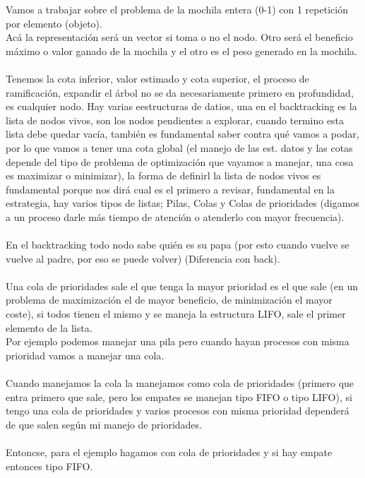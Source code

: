 \begin{example}
	Vamos a trabajar sobre el problema de la mochila entera (0-1) con 1 repetición por elemento (objeto).
	~\\
	Acá la representación será un vector si toma o no el nodo. Otro será el beneficio máximo o valor ganado de la mochila y el otro es el peso generado en la mochila.
	~\\
	Tenemos la cota inferior, valor estimado y cota superior, el proceso de ramificación, expandir el árbol no se da necesariamente primero en profundidad, es cualquier nodo. Hay varias eestructuras de datios, una en el backtracking es la lista de nodos vivos, son los nodos pendientes a explorar, cuando termino esta lista debe quedar vacía, también es fundamental saber contra qué vamos a podar, por lo que vamos a tener una cota global (el manejo de las est. datos y las cotas depende del tipo de problema de optimización que vayamos a manejar, una cosa es maximizar o minimizar), la forma de definirl la lista de nodos vivos es fundamental porque nos dirá cual es el primero a revisar, fundamental en la estrategia, hay varios tipos de listas; Pilas, Colas y Colas de prioridades (digamos a un proceso darle más tiempo de atención o atenderlo con mayor frecuencia).
	\\~\\
	En el backtracking todo nodo sabe quién es su papa (por esto  cuando vuelve se vuelve al padre, por eso se puede volver) (Diferencia con back).
	\\~\\
	Una cola de prioridades sale el que tenga la mayor prioridad es el que sale (en un problema de maximización el de mayor beneficio, de minimización el mayor coste), si todos tienen el mismo y se maneja la estructura LIFO, sale el primer elemento de la lista.
	~\\
	Por ejemplo podemos manejar una pila pero cuando hayan procesos con misma prioridad vamos a manejar una cola.
	\\~\\
	Cuando manejamos la cola la manejamos como cola de prioridades (primero que entra primero que sale, pero los empates se manejan tipo FIFO o tipo LIFO), si tengo una cola de prioridades y varios procesos con misma prioridad dependerá de que salen según mi manejo de prioridades.
	\\~\\
	Entoncse, para el ejemplo hagamos con cola de prioridades y si hay empate entonces tipo FIFO.


\end{example}
